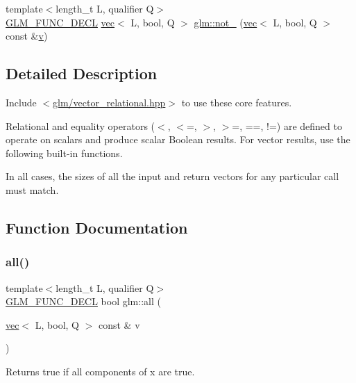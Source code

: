 \begin{DoxyCompactItemize}
\item 
{\footnotesize template$<$length\+\_\+t L, qualifier Q$>$ }\\\hyperlink{setup_8hpp_ab2d052de21a70539923e9bcbf6e83a51}{G\+L\+M\+\_\+\+F\+U\+N\+C\+\_\+\+D\+E\+CL} \hyperlink{structglm_1_1vec}{vec}$<$ L, bool, Q $>$ \hyperlink{group__core__func__vector__relational_ga464f1392c934f69a917ab8bb6eda5b09}{glm\+::not\+\_\+} (\hyperlink{structglm_1_1vec}{vec}$<$ L, bool, Q $>$ const \&\hyperlink{_s_d_l__opengl_8h_a10a82eabcb59d2fcd74acee063775f90}{v})
\end{DoxyCompactItemize}


\subsection{Detailed Description}
Include $<$\hyperlink{vector__relational_8hpp}{glm/vector\+\_\+relational.\+hpp}$>$ to use these core features.

Relational and equality operators ($<$, $<$=, $>$, $>$=, ==, !=) are defined to operate on scalars and produce scalar Boolean results. For vector results, use the following built-\/in functions.

In all cases, the sizes of all the input and return vectors for any particular call must match. 

\subsection{Function Documentation}
\mbox{\label{group__core__func__vector__relational_gab5af106b2d5675d51af84815d937384d}} 
\subsubsection{\texorpdfstring{all()}{all()}}
{\footnotesize\ttfamily template$<$length\+\_\+t L, qualifier Q$>$ \\
\hyperlink{setup_8hpp_ab2d052de21a70539923e9bcbf6e83a51}{G\+L\+M\+\_\+\+F\+U\+N\+C\+\_\+\+D\+E\+CL} bool glm\+::all (\begin{DoxyParamCaption}\item[{\hyperlink{structglm_1_1vec}{vec}$<$ L, bool, Q $>$ const \&}]{v }\end{DoxyParamCaption})}

Returns true if all components of x are true.


